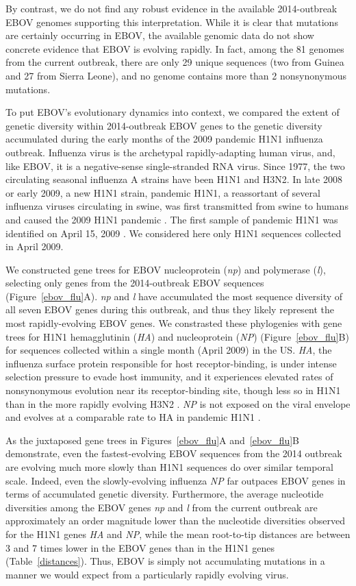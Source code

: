 \documentclass[11pt]{article}
\begin{document}
By contrast, we do not find any robust evidence in the available 2014-outbreak EBOV genomes supporting this interpretation. While it is clear that mutations are certainly occurring in EBOV, the available genomic data do not show concrete evidence that EBOV is evolving rapidly. In fact, among the 81 genomes from the current outbreak, there are only 29 unique sequences (two from Guinea and 27 from Sierra Leone), and no genome contains more than 2 nonsynonymous mutations.

To put EBOV's evolutionary dynamics into context, we compared the extent of genetic diversity within 2014-outbreak EBOV genes to the genetic diversity accumulated during the early months of the 2009 pandemic H1N1 influenza outbreak. Influenza virus is the archetypal rapidly-adapting human virus, and, like EBOV, it is a negative-sense single-stranded RNA virus. Since 1977, the two circulating seasonal influenza A strains have been H1N1 and H3N2. In late 2008 or early 2009, a new H1N1 strain, pandemic H1N1, a reassortant of several influenza viruses circulating in swine, was first transmitted from swine to humans and caused the 2009 H1N1 pandemic \cite{Smithetal2009}. The first sample of pandemic H1N1 was identified on April 15, 2009 \citep{Neumannetal2009}. We considered here only H1N1 sequences collected in April 2009. 

We constructed gene trees for EBOV nucleoprotein (\emph{np}) and polymerase (\emph{l}), selecting only genes from the 2014-outbreak EBOV sequences (Figure~\ref{ebov_flu}A). \emph{np} and \emph{l} have accumulated the most sequence diversity of all seven EBOV genes during this outbreak, and thus they likely represent the most rapidly-evolving EBOV genes. We constrasted these phylogenies with gene trees for H1N1 hemagglutinin (\emph{HA}) and nucleoprotein (\emph{NP}) (Figure~\ref{ebov_flu}B) for sequences collected within a single month (April 2009) in the US. \emph{HA}, the influenza surface protein responsible for host receptor-binding, is under intense selection pressure to evade host immunity, and it experiences elevated rates of nonsynonymous evolution near its receptor-binding site, though less so in H1N1 than in the more rapidly evolving H3N2 \citep{Meyer2012}. \emph{NP} is not exposed on the viral envelope and evolves at a comparable rate to HA in pandemic H1N1 \citep{Quetal2011}.

As the juxtaposed gene trees in Figures~\ref{ebov_flu}A and~\ref{ebov_flu}B  demonstrate, even the fastest-evolving EBOV sequences from the 2014 outbreak are evolving much more slowly than H1N1 sequences do over similar temporal scale. Indeed, even the slowly-evolving influenza \emph{NP} far outpaces EBOV genes in terms of accumulated genetic diversity. Furthermore, the average nucleotide diversities among the EBOV genes \emph{np} and \emph{l} from the current outbreak are approximately an order magnitude lower than the nucleotide diversities observed for the H1N1 genes \emph{HA} and \emph{NP}, while the mean root-to-tip distances are between 3 and 7 times lower in the EBOV genes than in the H1N1 genes (Table~\ref{distances}). Thus, EBOV is simply not accumulating mutations in a manner we would expect from a particularly rapidly evolving virus.
\end{document}
